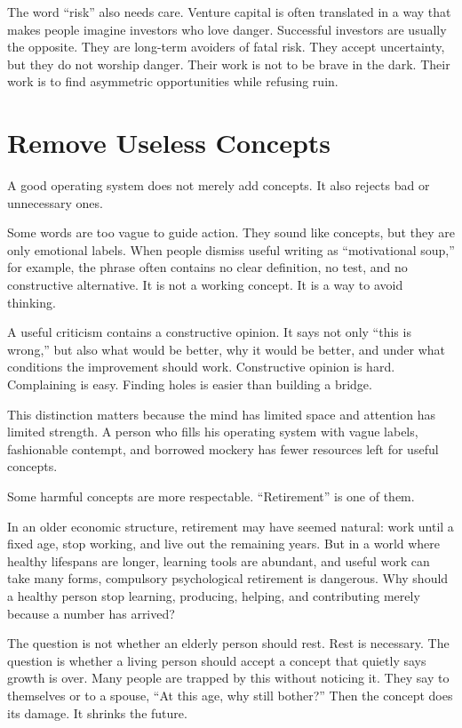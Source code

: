 The word ``risk'' also needs care. Venture capital is often translated in a way that makes people imagine investors who love danger. Successful investors are usually the opposite. They are long-term avoiders of fatal risk. They accept uncertainty, but they do not worship danger. Their work is not to be brave in the dark. Their work is to find asymmetric opportunities while refusing ruin.

\section*{Remove Useless Concepts}

A good operating system does not merely add concepts. It also rejects bad or unnecessary ones.

Some words are too vague to guide action. They sound like concepts, but they are only emotional labels. When people dismiss useful writing as ``motivational soup,'' for example, the phrase often contains no clear definition, no test, and no constructive alternative. It is not a working concept. It is a way to avoid thinking.

A useful criticism contains a constructive opinion. It says not only ``this is wrong,'' but also what would be better, why it would be better, and under what conditions the improvement should work. Constructive opinion is hard. Complaining is easy. Finding holes is easier than building a bridge.

This distinction matters because the mind has limited space and attention has limited strength. A person who fills his operating system with vague labels, fashionable contempt, and borrowed mockery has fewer resources left for useful concepts.

Some harmful concepts are more respectable. ``Retirement'' is one of them.

In an older economic structure, retirement may have seemed natural: work until a fixed age, stop working, and live out the remaining years. But in a world where healthy lifespans are longer, learning tools are abundant, and useful work can take many forms, compulsory psychological retirement is dangerous. Why should a healthy person stop learning, producing, helping, and contributing merely because a number has arrived?

The question is not whether an elderly person should rest. Rest is necessary. The question is whether a living person should accept a concept that quietly says growth is over. Many people are trapped by this without noticing it. They say to themselves or to a spouse, ``At this age, why still bother?'' Then the concept does its damage. It shrinks the future.

